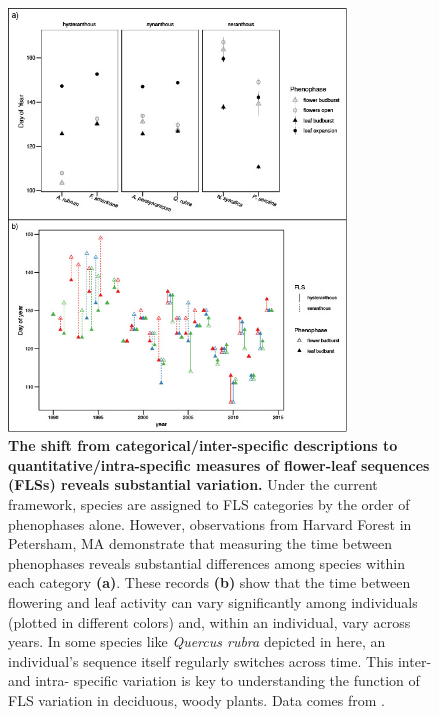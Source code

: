 \documentclass[11pt]{article}
\begin{document}
 \begin{figure}[h!]
        \centering
         \includegraphics[width=0.8\textwidth]{..//..//intraspecificplots.jpg}
          \caption{\textbf{The shift from categorical/inter-specific descriptions to quantitative/intra-specific measures of flower-leaf sequences (FLSs) reveals substantial variation.} Under the current framework, species are assigned to FLS categories by the order of phenophases alone. However, observations from Harvard Forest in Petersham, MA demonstrate that measuring the time between phenophases reveals substantial differences among species within each category \textbf{(a)}. These records \textbf{(b)} show that the time between flowering and leaf activity can vary significantly among individuals (plotted in different colors) and, within an individual, vary across years. In some species like \emph{Quercus rubra} depicted in here, an individual's sequence itself regularly switches across time. This inter- and intra- specific variation is key to understanding the function of FLS variation in deciduous, woody plants. Data comes from \citet{OKeefe2015}.}
        \label{fig:vizzy}
    \end{figure}
\end{document}

